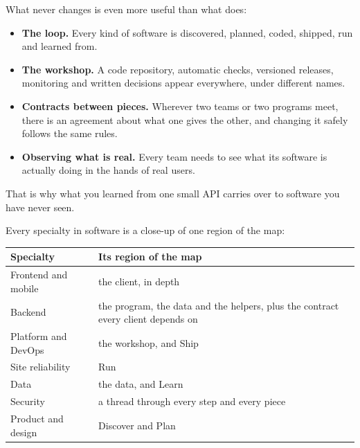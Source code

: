 What never changes is even more useful than what does:

\begin{itemize}
\tightlist
\item
  \textbf{The loop.} Every kind of software is discovered, planned, coded, shipped, run and learned from.
\item
  \textbf{The workshop.} A code repository, automatic checks, versioned releases, monitoring and written decisions appear everywhere, under different names.
\item
  \textbf{Contracts between pieces.} Wherever two teams or two programs meet, there is an agreement about what one gives the other, and changing it safely follows the same rules.
\item
  \textbf{Observing what is real.} Every team needs to see what its software is actually doing in the hands of real users.
\end{itemize}

\noindent{}That is why what you learned from one small API carries over to software you have never seen.

\label{the-same-process-in-a-team:where-specialists-sit}

Every specialty in software is a close-up of one region of the map:


{\def\LTcaptype{none} %
\begin{longtable}[]{@{}
  >{\raggedright\arraybackslash}p{}
  >{\raggedright\arraybackslash}p{}@{}}
\toprule\noalign{}
\begin{minipage}[b]{\linewidth}\raggedright
Specialty
\end{minipage} & \begin{minipage}[b]{\linewidth}\raggedright
Its region of the map
\end{minipage} \\
\midrule\noalign{}
\endhead
\bottomrule\noalign{}
\endlastfoot
Frontend and mobile & the client, in depth \\
Backend & the program, the data and the helpers, plus the contract every client depends on \\
Platform and DevOps & the workshop, and Ship \\
Site reliability & Run \\
Data & the data, and Learn \\
Security & a thread through every step and every piece \\
Product and design & Discover and Plan \\
\end{longtable}
}

